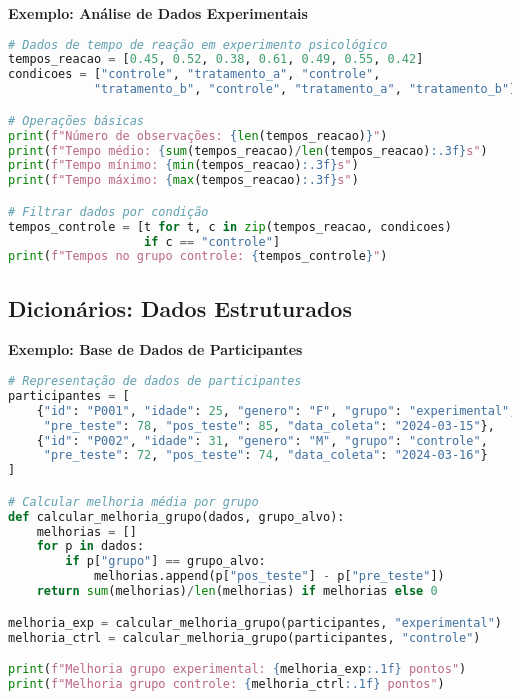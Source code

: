 \begin{examplebox}
\textbf{Exemplo: Análise de Dados Experimentais}

\begin{lstlisting}[language=Python,breaklines=true,postbreak=\mbox{\textcolor{red}{$\hookrightarrow$}\space}]
# Dados de tempo de reação em experimento psicológico
tempos_reacao = [0.45, 0.52, 0.38, 0.61, 0.49, 0.55, 0.42]
condicoes = ["controle", "tratamento_a", "controle", 
            "tratamento_b", "controle", "tratamento_a", "tratamento_b"]

# Operações básicas
print(f"Número de observações: {len(tempos_reacao)}")
print(f"Tempo médio: {sum(tempos_reacao)/len(tempos_reacao):.3f}s")
print(f"Tempo mínimo: {min(tempos_reacao):.3f}s")
print(f"Tempo máximo: {max(tempos_reacao):.3f}s")

# Filtrar dados por condição
tempos_controle = [t for t, c in zip(tempos_reacao, condicoes) 
                   if c == "controle"]
print(f"Tempos no grupo controle: {tempos_controle}")
\end{lstlisting}
\end{examplebox}

\subsection{Dicionários: Dados Estruturados}

\begin{examplebox}
\textbf{Exemplo: Base de Dados de Participantes}

\begin{lstlisting}[language=Python,breaklines=true,postbreak=\mbox{\textcolor{red}{$\hookrightarrow$}\space}]
# Representação de dados de participantes
participantes = [
    {"id": "P001", "idade": 25, "genero": "F", "grupo": "experimental",
     "pre_teste": 78, "pos_teste": 85, "data_coleta": "2024-03-15"},
    {"id": "P002", "idade": 31, "genero": "M", "grupo": "controle",
     "pre_teste": 72, "pos_teste": 74, "data_coleta": "2024-03-16"}
]

# Calcular melhoria média por grupo
def calcular_melhoria_grupo(dados, grupo_alvo):
    melhorias = []
    for p in dados:
        if p["grupo"] == grupo_alvo:
            melhorias.append(p["pos_teste"] - p["pre_teste"])
    return sum(melhorias)/len(melhorias) if melhorias else 0

melhoria_exp = calcular_melhoria_grupo(participantes, "experimental")
melhoria_ctrl = calcular_melhoria_grupo(participantes, "controle")

print(f"Melhoria grupo experimental: {melhoria_exp:.1f} pontos")
print(f"Melhoria grupo controle: {melhoria_ctrl:.1f} pontos")
\end{lstlisting}
\end{examplebox}

